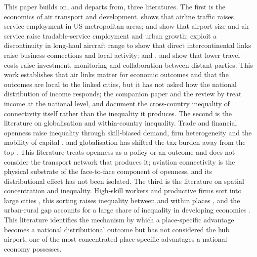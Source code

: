 This paper builds on, and departs from, three literatures. The first is the economics of air transport and development. \citet{Brueckner_2003} shows that airline traffic raises service employment in US metropolitan areas; \citet{Sheard_2014} and \citet{Blonigen_2015} show that airport size and air service raise tradable-service employment and urban growth; \citet{Campante_2018} exploit a discontinuity in long-haul aircraft range to show that direct intercontinental links raise business connections and local activity; and \citet{Giroud_2013}, \citet{Bernstein_2016} and \citet{Catalini_2020} show that lower travel costs raise investment, monitoring and collaboration between distant parties. This work establishes that air links matter for economic outcomes and that the outcomes are local to the linked cities, but it has not asked how the national distribution of income responds; the companion paper \citep{Yue_2026} and the review by \citet{Lenaerts_2021} treat income at the national level, and \citet{Sun_2024} document the cross-country inequality of connectivity itself rather than the inequality it produces. The second is the literature on globalisation and within-country inequality. Trade and financial openness raise inequality through skill-biased demand, firm heterogeneity and the mobility of capital \citep{Feenstra_1997,Jaumotte_2013,Helpman_2017,Furceri_2019,Lang_2023}, and globalisation has shifted the tax burden away from the top \citep{Egger_2019}. This literature treats openness as a policy or an outcome and does not consider the transport network that produces it; aviation connectivity is the physical substrate of the face-to-face component of openness, and its distributional effect has not been isolated. The third is the literature on spatial concentration and inequality. High-skill workers and productive firms sort into large cities \citep{Diamond_2016,Gaubert_2018}, this sorting raises inequality between and within places \citep{Moretti_2013,BaumSnow_2018,Fajgelbaum_2020}, and the urban-rural gap accounts for a large share of inequality in developing economies \citep{Young_2013}. This literature identifies the mechanism by which a place-specific advantage becomes a national distributional outcome but has not considered the hub airport, one of the most concentrated place-specific advantages a national economy possesses.

